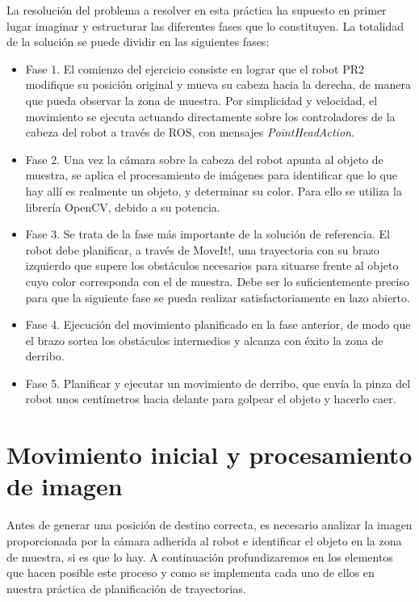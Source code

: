 \documentclass[12pt,spanish,chapterprefix, numbers=noenddot]{book}
\numberwithin{equation}{section}
\numberwithin{figure}{section}
\begin{document}
La resolución del problema a resolver en esta práctica ha supuesto en primer lugar imaginar y estructurar las diferentes fases que lo constituyen. La totalidad de la solución se puede dividir en las siguientes fases: 
\begin{itemize}
    \item Fase 1. El comienzo del ejercicio consiste en lograr que el robot PR2 modifique su posición original y mueva su cabeza hacia la derecha, de manera que pueda observar la zona de muestra. Por simplicidad y velocidad, el movimiento se ejecuta actuando directamente sobre los controladores de la cabeza del robot a través de ROS, con mensajes \textit{PointHeadAction}.
    \item Fase 2. Una vez la cámara sobre la cabeza del robot apunta al objeto de muestra, se aplica el procesamiento de imágenes para identificar que lo que hay allí es realmente un objeto, y determinar su color. Para ello se utiliza la librería OpenCV, debido a su potencia. 
    \item Fase 3. Se trata de la fase más importante de la solución de referencia. El robot debe planificar, a través de MoveIt!, una trayectoria con su brazo izquierdo que supere los obstáculos necesarios para situarse frente al objeto cuyo color corresponda con el de muestra. Debe ser lo suficientemente preciso para que la siguiente fase se pueda realizar satisfactoriamente en lazo abierto. 
    \item Fase 4. Ejecución del movimiento planificado en la fase anterior, de modo que el brazo sortea los obstáculos intermedios y alcanza con éxito la zona de derribo.  
    \item Fase 5. Planificar y ejecutar un movimiento de derribo, que envía la pinza del robot unos centímetros hacia delante para golpear el objeto y hacerlo caer. 
\end{itemize}


\section{Movimiento inicial y procesamiento de imagen}
Antes de generar una posición de destino correcta, es necesario analizar la imagen proporcionada por la cámara adherida al robot  e identificar el objeto en la zona de muestra, si es que lo hay. 
A continuación profundizaremos en los elementos que hacen posible este proceso y como se implementa cada uno de ellos en nuestra práctica de planificación de trayectorias. 
\end{document}
